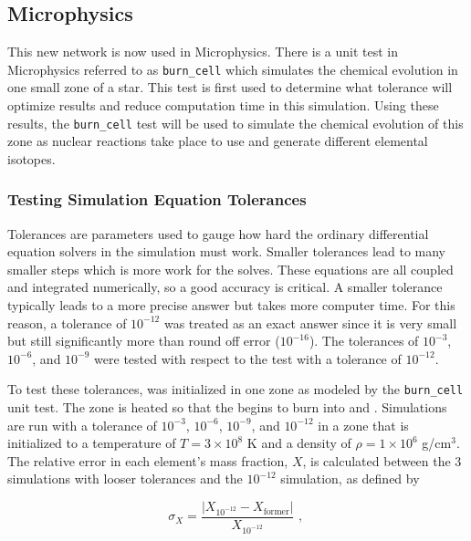 \documentclass[preprint]{aastex62}
\begin{document}
  \subsection{Microphysics}
  
    This new network is now used in Microphysics. There is a unit test in Microphysics referred to as {\tt burn\_cell} which simulates the chemical evolution in one small zone of a star. This test is first used to determine what tolerance will optimize results and reduce computation time in this simulation. Using these results, the {\tt burn\_cell} test will be used to simulate the chemical evolution of this zone as nuclear reactions take place to use and generate different elemental isotopes. 
  
    \subsubsection{Testing Simulation Equation Tolerances}
  
      Tolerances are parameters used to gauge how hard the ordinary differential equation solvers in the simulation must work. Smaller tolerances lead to many smaller steps which is more work for the solves. These equations are all coupled and integrated numerically, so a good accuracy is critical. A smaller tolerance typically leads to a more precise answer but takes more computer time. For this reason, a tolerance of $10^{-12}$ was treated as an exact answer since it is very small but still significantly more than round off error ($10^{-16}$). The tolerances of $10^{-3}$, $10^{-6}$, and $10^{-9}$ were tested with respect to the test with a tolerance of $10^{-12}$. 
     
      To test these tolerances,  was initialized in one zone as modeled by the {\tt burn\_cell} unit test. The zone is heated so that the  begins to burn into  and . Simulations are run with a tolerance of $10^{-3}$, $10^{-6}$, $10^{-9}$, and $10^{-12}$ in a zone that is initialized to a temperature of $T = 3 \times 10^8$ K and a density of $\rho = 1 \times 10^6$ g/cm$^3$. The relative error in each element's mass fraction, $X$, is calculated between the 3 simulations with looser tolerances and the $10^{-12}$ simulation, as defined by 
    
      \begin{equation}
        \sigma_X = \frac{\lvert X_{10^{-12}} - X_{\text{former}} \rvert }{X_{10^{-12}}} \text{    , }
        \label{eq:relativeerror}
      \end{equation}
    
\end{document}
